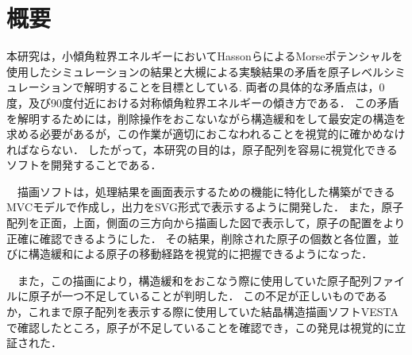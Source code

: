 \section{概要}
本研究は，小傾角粒界エネルギーにおいてHassonらによるMorseポテンシャルを使用したシミュレーションの結果と大槻による実験結果の矛盾を原子レベルシミュレーションで解明することを目標としている.
両者の具体的な矛盾点は，0度，及び90度付近における対称傾角粒界エネルギーの傾き方である．
この矛盾を解明するためには，削除操作をおこないながら構造緩和をして最安定の構造を求める必要があるが，この作業が適切におこなわれることを視覚的に確かめなければならない．
したがって，本研究の目的は，原子配列を容易に視覚化できるソフトを開発することである．

　描画ソフトは，処理結果を画面表示するための機能に特化した構築ができるMVCモデルで作成し，出力をSVG形式で表示するように開発した．
また，原子配列を正面，上面，側面の三方向から描画した図で表示して，原子の配置をより正確に確認できるようにした．
その結果，削除された原子の個数と各位置，並びに構造緩和による原子の移動経路を視覚的に把握できるようになった．

　また，この描画により，構造緩和をおこなう際に使用していた原子配列ファイルに原子が一つ不足していることが判明した．
この不足が正しいものであるか，これまで原子配列を表示する際に使用していた結晶構造描画ソフトVESTAで確認したところ，原子が不足していることを確認でき，この発見は視覚的に立証された．

